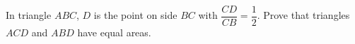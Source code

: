 In triangle $ABC$, $D$ is the point on side $BC$ with $\dfrac{CD}{CB}=\dfrac12$. Prove that triangles $ACD$ and $ABD$ have equal areas.
